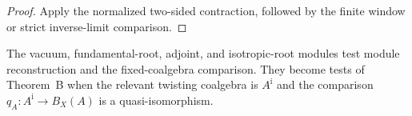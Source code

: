 \begin{proof}
Apply the normalized two-sided contraction, followed by the finite
window or strict inverse-limit comparison.
\end{proof}

\begin{remark}
\label{rem:tbsp-named-comodules-module-surface}
The vacuum, fundamental-root, adjoint, and isotropic-root modules test
module reconstruction and the fixed-coalgebra comparison.  They become
tests of Theorem~B when the relevant twisting coalgebra is
\(A^{\mathrm i}\) and the comparison
\(q_A\colon A^{\mathrm i}\to B_X(A)\) is a quasi-isomorphism.
\end{remark}
